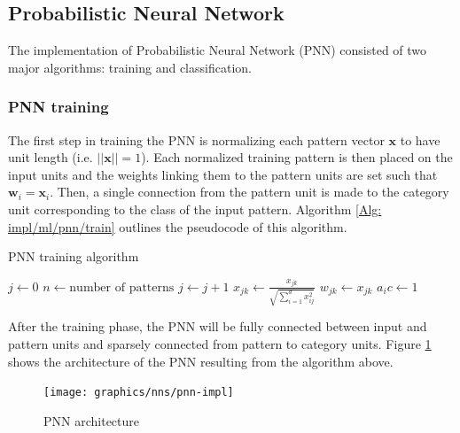 	\subsection{Probabilistic Neural Network} \label{Section: impl/ml/pnn}
	The implementation of Probabilistic Neural Network (PNN) consisted of two major algorithms: training and classification.
	\subsubsection*{PNN training}
	The first step in training the PNN is normalizing each pattern vector $\mathbf{x}$ to have unit length (i.e. $\vert\vert \mathbf{x}\vert\vert = 1$). Each normalized training pattern is then placed on the input units and the weights linking them to the pattern units are set such that $\mathbf{w}_i = \mathbf{x}_i$. Then, a single connection from the pattern unit is made to the category unit corresponding to the class of the input pattern. Algorithm \ref{Alg: impl/ml/pnn/train} outlines the pseudocode of this algorithm.
	\begin{algorithm}[H]
		\caption{PNN training algorithm}
		\label{Alg: impl/ml/pnn/train}
		\begin{algorithmic}
				\State $j \gets 0$
				\State $n \gets \text{number of patterns}$ 
				\Do
					\State $j \gets j + 1$
					\State $x_{jk} \gets \frac{x_{jk}}{\sqrt{\sum_{i=1}^{d}x_{ij}^2}}$ 
					\State $w_{jk} \gets x_{jk}$ 
						\State $a_ic \gets 1$
					\EndIf
			\EndProcedure
		\end{algorithmic}
	\end{algorithm}
	After the training phase, the PNN will be fully connected between input and pattern units and sparsely connected from pattern to category units. Figure \ref{Fig: impl/ml/pnn/architecture} shows the architecture of the PNN resulting from the algorithm above.
	\begin{figure}[H]
		\centering
		\texttt{[image: graphics/nns/pnn-impl]}
		\caption{PNN architecture}
		\label{Fig: impl/ml/pnn/architecture}
	\end{figure}

